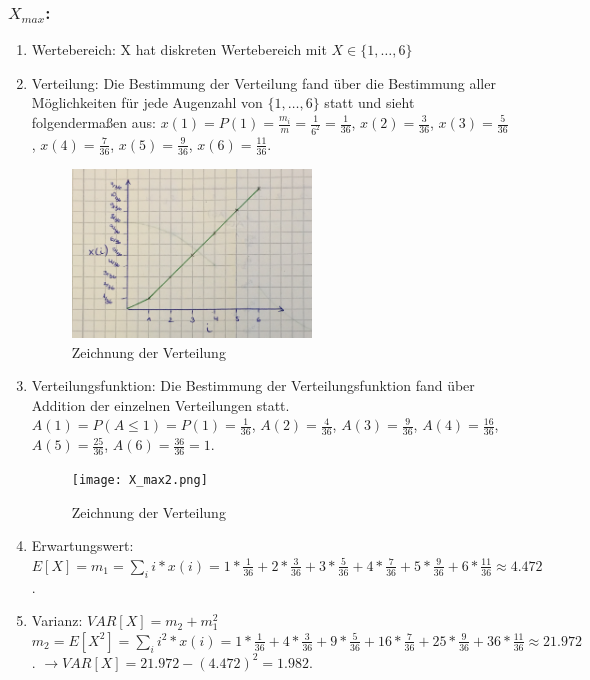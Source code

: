 \documentclass[%
10pt,              %
ngerman,           %
a4paper,           %
DIV11,             %
]{scrartcl}%
\begin{document}
\subsubsection*{$X_{max}$:}

\begin{enumerate}
	\item Wertebereich: X hat diskreten Wertebereich mit $X \in \{1, \dots, 6 \}$
	\item Verteilung: Die Bestimmung der Verteilung fand über die Bestimmung aller Möglichkeiten für jede Augenzahl von $\{1, \dots, 6 \}$ statt und sieht folgendermaßen aus:\newline
	$x(1) = P(1) = \frac{m_i}{m} = \frac{1}{6^2} = \frac{1}{36}$,\newline
	$x(2) = \frac{3}{36}$, $x(3) = \frac{5}{36}$, $x(4) = \frac{7}{36}$, $x(5) = \frac{9}{36}$, $x(6) = \frac{11}{36}$. 
	
	\begin{figure}[!htbp]
		\centering
		\caption{Zeichnung der Verteilung}
		\includegraphics[width=0.6\textwidth]{X_max1.png}
	\end{figure}
	
	\item Verteilungsfunktion: Die Bestimmung der Verteilungsfunktion fand über Addition der einzelnen Verteilungen statt.\newline
	$A(1) = P(A \leq 1) = P(1) = \frac{1}{36}$,\newline
	$A(2) = \frac{4}{36}$, $A(3) = \frac{9}{36}$, $A(4) = \frac{16}{36}$, $A(5) = \frac{25}{36}$, $A(6) = \frac{36}{36} = 1$. 
	
	\begin{figure}[!htbp]
		\centering
		\caption{Zeichnung der Verteilung}
		\texttt{[image: X\_max2.png]}
	\end{figure}
	
	\item Erwartungswert: $E[X] = m_1 = \sum_{i} i * x(i) = 1 * \frac{1}{36} + 2 * \frac{3}{36} + 3 * \frac{5}{36} + 4 * \frac{7}{36} + 5 * \frac{9}{36} + 6 * \frac{11}{36} \approx 4.472$.
	\item Varianz: $VAR[X] = m_2 + m_1^2$\newline
	$m_2 = E[X^2] = \sum_{i} i^2 * x(i) = 1 * \frac{1}{36} + 4 * \frac{3}{36} + 9 * \frac{5}{36} + 16 * \frac{7}{36} + 25 * \frac{9}{36} + 36 * \frac{11}{36} \approx 21.972$.\newline
	$\rightarrow VAR[X] = 21.972 - (4.472)^2 = 1.982$.
\end{enumerate}
\end{document}
